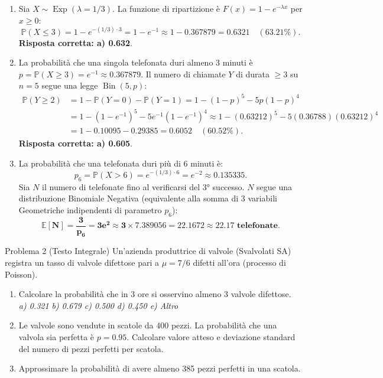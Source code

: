 \documentclass[11pt,a4paper]{article}
\newcommand{\EE}{\mathbb{E}}
\newcommand{\Prob}{\mathbb{P}}
\begin{document}
\begin{soluzionebox}
\begin{enumerate}[label=(\alph*)]
    \item Sia $X \sim \operatorname{Exp}(\lambda = 1/3)$. La funzione di ripartizione è $F(x) = 1 - e^{-\lambda x}$ per $x \ge 0$:
    \[
    \Prob(X \le 3) = 1 - e^{-(1/3) \cdot 3} = 1 - e^{-1} \approx 1 - 0.367879 = \mathbf{0.6321} \quad (\mathbf{63.21\%}).
    \]
    \textbf{Risposta corretta: a) 0.632}.

    \item La probabilità che una singola telefonata duri almeno 3 minuti è $p = \Prob(X \ge 3) = e^{-1} \approx 0.367879$.
    Il numero di chiamate $Y$ di durata $\ge 3$ su $n=5$ segue una legge $\operatorname{Bin}(5, p)$:
    \begin{align*}
    \Prob(Y \ge 2) &= 1 - \Prob(Y = 0) - \Prob(Y = 1) = 1 - (1-p)^5 - 5p(1-p)^4 \\
    &= 1 - (1 - e^{-1})^5 - 5e^{-1}(1 - e^{-1})^4 \approx 1 - (0.63212)^5 - 5(0.36788)(0.63212)^4 \\
    &= 1 - 0.10095 - 0.29385 = \mathbf{0.6052} \quad (\mathbf{60.52\%}).
    \end{align*}
    \textbf{Risposta corretta: a) 0.605}.

    \item La probabilità che una telefonata duri più di 6 minuti è:
    \[
    p_6 = \Prob(X > 6) = e^{-(1/3) \cdot 6} = e^{-2} \approx 0.135335.
    \]
    Sia $N$ il numero di telefonate fino al verificarsi del 3° successo. $N$ segue una distribuzione Binomiale Negativa (equivalente alla somma di 3 variabili Geometriche indipendenti di parametro $p_6$):
    \[
    \mathbf{\EE[N] = \frac{3}{p_6} = 3 e^2 \approx 3 \times 7.389056 = 22.1672 \approx 22.17\text{ telefonate}}.
    \]
\end{enumerate}
\end{soluzionebox}

\begin{problemabox}{Problema 2 (Testo Integrale)}
Un'azienda produttrice di valvole (Svalvolati SA) registra un tasso di valvole difettose pari a $\mu = 7/6$ difetti all'ora (processo di Poisson).
\begin{enumerate}[label=(\alph*)]
    \item Calcolare la probabilità che in 3 ore si osservino almeno 3 valvole difettose.\\
    \emph{a) 0.321 \quad b) 0.679 \quad c) 0.500 \quad d) 0.450 \quad e) Altro}
    \item Le valvole sono vendute in scatole da 400 pezzi. La probabilità che una valvola sia perfetta è $p = 0.95$. Calcolare valore atteso e deviazione standard del numero di pezzi perfetti per scatola.
    \item Approssimare la probabilità di avere almeno 385 pezzi perfetti in una scatola.
\end{enumerate}
\end{problemabox}
\end{document}
